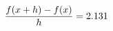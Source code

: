 \documentclass[preview]{standalone}
\begin{document}
\begin{align*}
\special{dvisvgm:raw <g id='unique000'>}\frac{f(x+h)-f(x)}{h} = 2.131\special{dvisvgm:raw </g>}
\end{align*}
\end{document}
